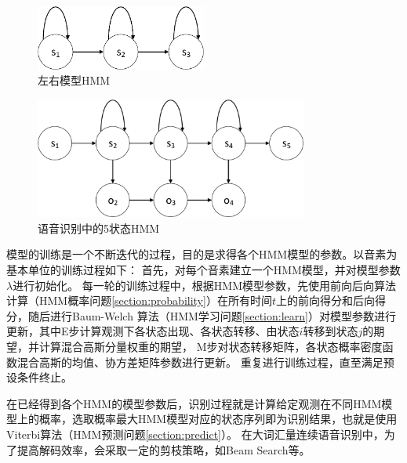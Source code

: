     \begin{figure}[htbp]
    \centering
    \includegraphics[width=0.5\textwidth]{figures/chapter2/left_right-crop}
    \caption{左右模型HMM}
    \label{fig:left_right}
    \end{figure}

    \begin{figure}[htbp]
    \centering
    \includegraphics[width=0.8\textwidth]{figures/chapter2/asr_hmm-crop}
    \caption{语音识别中的5状态HMM}
    \label{fig:asr_hmm}
    \end{figure}

    模型的训练是一个不断迭代的过程，目的是求得各个HMM模型的参数。以音素为基本单位的训练过程如下：
    首先，对每个音素建立一个HMM模型，并对模型参数$\lambda $进行初始化。
    每一轮的训练过程中，根据HMM模型参数，先使用前向后向算法计算（HMM概率问题\ref{section:probability}）在所有时间$t$上的前向得分和后向得分，随后进行Baum-Welch
    算法（HMM学习问题\ref{section:learn}）对模型参数进行更新，其中E步计算观测下各状态出现、各状态转移、由状态$i$转移到状态$j$的期望，并计算混合高斯分量权重的期望，
    M步对状态转移矩阵，各状态概率密度函数混合高斯的均值、协方差矩阵参数进行更新。
    重复进行训练过程，直至满足预设条件终止。

    在已经得到各个HMM的模型参数后，识别过程就是计算给定观测在不同HMM模型上的概率，选取概率最大HMM模型对应的状态序列即为识别结果，也就是使用Viterbi算法（HMM预测问题\ref{section:predict}）。
    在大词汇量连续语音识别中，为了提高解码效率，会采取一定的剪枝策略，如Beam Search等。

